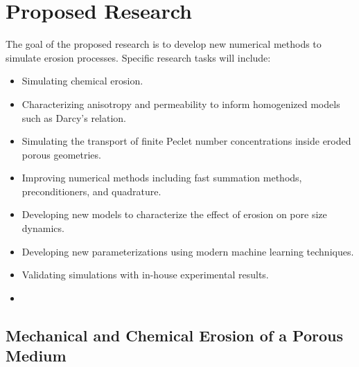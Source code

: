 \documentclass[11pt]{article}
\begin{document}
\section{Proposed Research} 
The goal of the proposed research is to develop new numerical methods to
simulate erosion processes. Specific research tasks will include:
\begin{itemize}[noitemsep]
  \item Simulating chemical erosion.

  \item Characterizing anisotropy and permeability to inform
    homogenized models such as Darcy's relation.

  \item Simulating the transport of finite Peclet number concentrations
    inside eroded porous geometries.

  \item Improving numerical methods including fast summation methods,
    preconditioners, and quadrature.

  \item Developing new models to characterize the effect of erosion on
    pore size dynamics.

  \item Developing new parameterizations using modern machine learning
    techniques.

  \item Validating simulations with in-house experimental results.

  \item {}
\end{itemize}



\subsection{Mechanical and Chemical Erosion of a Porous Medium}
\end{document}
